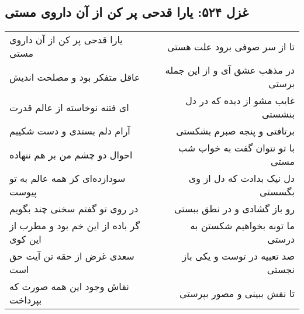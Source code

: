 \begin{center}
\section*{غزل ۵۲۴: یارا قدحی پر کن از آن داروی مستی}
\label{sec:524}
\begin{longtable}{l p{0.5cm} r}
یارا قدحی پر کن از آن داروی مستی
&&
تا از سر صوفی برود علت هستی
\\
عاقل متفکر بود و مصلحت اندیش
&&
در مذهب عشق آی و از این جمله برستی
\\
ای فتنه نوخاسته از عالم قدرت
&&
غایب مشو از دیده که در دل بنشستی
\\
آرام دلم بستدی و دست شکیبم
&&
برتافتی و پنجه صبرم بشکستی
\\
احوال دو چشم من بر هم ننهاده
&&
با تو نتوان گفت به خواب شب مستی
\\
سودازده‌ای کز همه عالم به تو پیوست
&&
دل نیک بدادت که دل از وی بگسستی
\\
در روی تو گفتم سخنی چند بگویم
&&
رو باز گشادی و در نطق ببستی
\\
گر باده از این خم بود و مطرب از این کوی
&&
ما توبه بخواهیم شکستن به درستی
\\
سعدی غرض از حقه تن آیت حق است
&&
صد تعبیه در توست و یکی باز نجستی
\\
نقاش وجود این همه صورت که بپرداخت
&&
تا نقش ببینی و مصور بپرستی
\\
\end{longtable}
\end{center}
